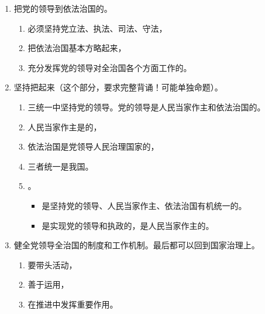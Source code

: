 \begin{enumerate}
\begin{enumerate}
\begin{enumerate}
\begin{enumerate}
                          \item 才能全治国这一“系统工程”的，才能全治国的。
                        \end{enumerate}
                  \item 把党的领导到依法治国的。
                        \begin{enumerate}
                          \item 必须坚持党立法、执法、司法、守法，
                          \item 把依法治国基本方略起来，
                          \item 充分发挥党的领导对全治国各个方面工作的。
                        \end{enumerate}
                  \item 坚持把起来（这个部分，要求完整背诵！可能单独命题）。
                        \begin{enumerate}
                          \item 三统一中坚持党的领导。党的领导是人民当家作主和依法治国的。
                          \item 人民当家作主是的，
                          \item 依法治国是党领导人民治理国家的，
                          \item 三者统一是我国。
                          \item {}。
                                \begin{itemize}
                                  \item 是坚持党的领导、人民当家作主、依法治国有机统一的。
                                  \item 是实现党的领导和执政的，是人民当家作主的。
                                \end{itemize}
                        \end{enumerate}
                  \item 健全党领导全治国的制度和工作机制。最后都可以回到国家治理上。
                        \begin{enumerate}
                          \item {}要带头活动，
                          \item 善于运用，
                          \item 在推进中发挥重要作用。
                        \end{enumerate}
                \end{enumerate}
        \end{enumerate}
\end{enumerate}
